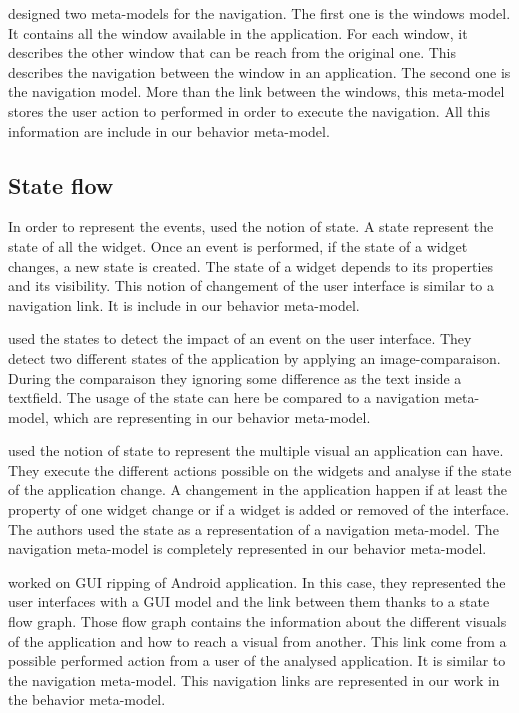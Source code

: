 \documentclass[conference]{IEEEtran}
\begin{document}
\citet{morgado2011reverse} designed two meta-models for the navigation.
The first one is the windows model.
It contains all the window available in the application.
For each window, it describes the other window that can be reach from the original one.
This describes the navigation between the window in an application.
The second one is the navigation model.
More than the link between the windows,
    this meta-model stores the user action to performed in order to execute the navigation.
All this information are include in our behavior meta-model.

\subsection{State flow}
\label{sec:state}

In order to represent the events, 
    \citet{memon2007eventflow} used the notion of state.
A state represent the state of all the widget.
Once an event is performed,
    if the state of a widget changes, a new state is created.
The state of a widget depends to its properties and its visibility.
This notion of changement of the user interface is similar to a navigation link.
It is include in our behavior meta-model.

\citet{joorabchi2012reverse} used the states to detect the impact
    of an event on the user interface.
They detect two different states of the application by applying an image-comparaison.
During the comparaison they ignoring some difference as the text inside a textfield.
The usage of the state can here be compared to a navigation meta-model,
    which are representing in our behavior meta-model.

\citet{mesbah2012crawling} used the notion of state to represent the multiple
    visual an application can have.
They execute the different actions possible on the widgets and analyse if the state of the application change.
A changement in the application happen if at least the property of one widget change or if a widget is added or removed of the interface.
The authors used the state as a representation of a navigation meta-model.
The navigation meta-model is completely represented in our behavior meta-model.

\citet{amalfitano2012using} worked on GUI ripping of Android application.
In this case, they represented the user interfaces with a GUI model and the link
    between them thanks to a state flow graph.
Those flow graph contains the information about the different visuals of the application and how to reach
    a visual from another.
This link come from a possible performed action from a user of the analysed application.
It is similar to the navigation meta-model.
This navigation links are represented in our work in the behavior meta-model.
\end{document}
